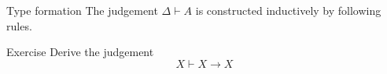 \begin{frame}{Type formation}
  The judgement $\Delta \vdash A$ is constructed inductively by following rules.
  \begin{multicols}{2}
    \begin{prooftree}
    \end{prooftree}
    \columnbreak
    \begin{prooftree}
    \end{prooftree}
  \end{multicols}
  \begin{prooftree}
  \end{prooftree}

  \begin{block}{Exercise}
    Derive the judgement 
    \[
        X \vdash X \to X
    \]
  \end{block}
\end{frame}

